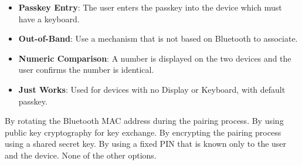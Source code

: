 \begin{solution}
    \begin{itemize}
        \item \textbf{Passkey Entry}: The user enters the passkey into the device which must have a keyboard.
        \item \textbf{Out-of-Band}: Use a mechanism that is not based on Bluetooth to associate.
        \item \textbf{Numeric Comparison}: A number is displayed on the two devices and the user confirms the number is identical.
        \item \textbf{Just Works}: Used for devices with no Display or Keyboard, with default passkey.
    \end{itemize}
\end{solution}

\begin{checkboxes}
    \choice By rotating the Bluetooth MAC address during the pairing process.
    \choice By using public key cryptography for key exchange.
    \CorrectChoice By encrypting the pairing process using a shared secret key.
    \choice By using a fixed PIN that is known only to the user and the device.
    \choice None of the other options.
\end{checkboxes}